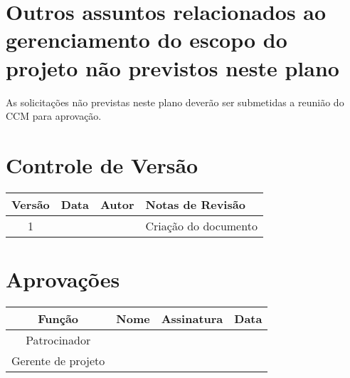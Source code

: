 \section{Outros assuntos relacionados ao gerenciamento do escopo do projeto não previstos neste plano}

As solicitações não previstas neste plano deverão ser submetidas a reunião do CCM para aprovação.

\section{Controle de Versão}

\begin{table}[H]
	\begin{tabularx}{\textwidth}{| c | c | X | X |}
		\hline
		\textbf{Versão} & \textbf{Data} & \textbf{Autor}      & \textbf{Notas de Revisão} \\
		\hline
		1                &               & \projectManagerName{} & Criação do documento     \\
		\hline
	\end{tabularx}
	\centering
\end{table}

\section{Aprovações}

\begin{table}[H]
	\begin{tabularx}{\textwidth}{| c | c | X | c |}
		\hline
		\textbf{Função}  & \textbf{Nome}       & \textbf{Assinatura}      & \textbf{Data} \\
		\hline
		Patrocinador       & \projectSponsorName{} & \projectSponsorSignature{} &               \\
		\hline
		Gerente de projeto & \projectManagerName{} & \projectManagerSignature{} &               \\
		\hline
	\end{tabularx}
	\centering
\end{table}